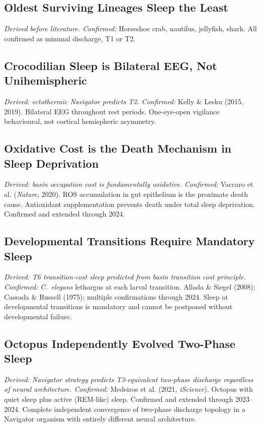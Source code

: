 \documentclass[10pt, a4paper]{article}
\begin{document}
\subsection{Oldest Surviving Lineages Sleep
the Least}
\textit{Derived before literature.
Confirmed:} Horseshoe crab, nautilus,
jellyfish, shark. All confirmed as
minimal discharge, T1 or T2.

\subsection{Crocodilian Sleep is Bilateral
EEG, Not Unihemispheric}
\textit{Derived: ectothermic Navigator
predicts T2.
Confirmed:} Kelly \& Lesku (2015, 2019).
Bilateral EEG throughout rest periods.
One-eye-open vigilance behavioural, not
cortical hemispheric asymmetry.

\subsection{Oxidative Cost is the Death
Mechanism in Sleep Deprivation}
\textit{Derived: basin occupation cost
is fundamentally oxidative.
Confirmed:} Vaccaro et al.
(\textit{Nature}, 2020). ROS accumulation
in gut epithelium is the proximate death
cause. Antioxidant supplementation
prevents death under total sleep
deprivation. Confirmed and extended
through 2024.

\subsection{Developmental Transitions
Require Mandatory Sleep}
\textit{Derived: T6 transition-cost sleep
predicted from basin transition cost
principle.
Confirmed:} \textit{C.~elegans} lethargus
at each larval transition. Allada \&
Siegel (2008); Cassada \& Russell (1975);
multiple confirmations through 2024.
Sleep at developmental transitions is
mandatory and cannot be postponed without
developmental failure.

\subsection{Octopus Independently Evolved
Two-Phase Sleep}
\textit{Derived: Navigator strategy
predicts T3-equivalent two-phase discharge
regardless of neural architecture.
Confirmed:} Medeiros et al. (2021,
\textit{iScience}). Octopus with quiet
sleep plus active (REM-like) sleep.
Confirmed and extended through 2023--2024.
Complete independent convergence of
two-phase discharge topology in a
Navigator organism with entirely different
neural architecture.
\end{document}
